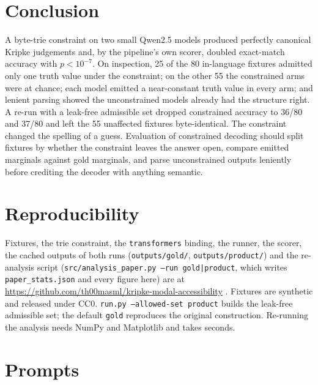 \documentclass[11pt]{article}
\begin{document}
\section{Conclusion}

A byte-trie constraint on two small Qwen2.5 models produced perfectly canonical Kripke judgements and, by the pipeline's own scorer, doubled exact-match accuracy with $p<10^{-7}$. On inspection, 25 of the 80 in-language fixtures admitted only one truth value under the constraint; on the other 55 the constrained arms were at chance; each model emitted a near-constant truth value in every arm; and lenient parsing showed the unconstrained models already had the structure right. A re-run with a leak-free admissible set dropped constrained accuracy to 36/80 and 37/80 and left the 55 unaffected fixtures byte-identical. The constraint changed the spelling of a guess. Evaluation of constrained decoding should split fixtures by whether the constraint leaves the answer open, compare emitted marginals against gold marginals, and parse unconstrained outputs leniently before crediting the decoder with anything semantic.

\section*{Reproducibility}
\label{sec:repro}

Fixtures, the trie constraint, the \texttt{transformers} binding, the runner, the scorer, the cached outputs of both runs (\texttt{outputs/gold/}, \texttt{outputs/product/}) and the re-analysis script (\texttt{src/analysis\_paper.py --run gold|product}, which writes \texttt{paper\_stats.json} and every figure here) are at \url{https://github.com/th00masml/kripke-modal-accessibility} \citep{nawara2026kripke}. Fixtures are synthetic and released under CC0. \texttt{run.py --allowed-set product} builds the leak-free admissible set; the default \texttt{gold} reproduces the original construction. Re-running the analysis needs NumPy and Matplotlib and takes seconds.




\appendix

\section{Prompts}
\label{app:prompt}
\end{document}
